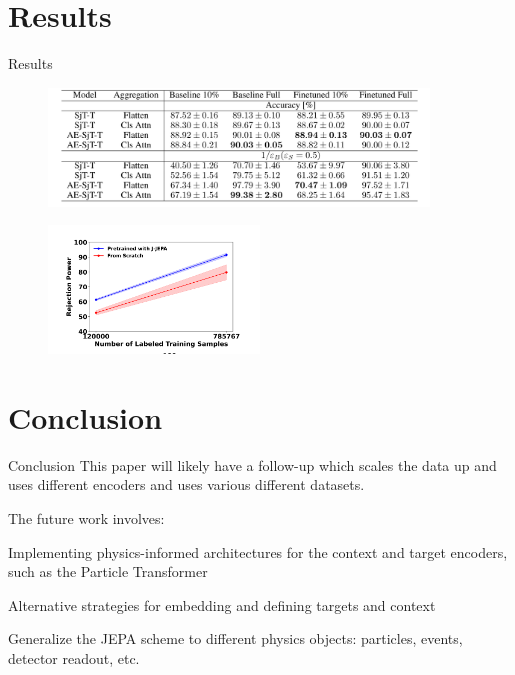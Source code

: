 \documentclass[10pt]{beamer}
\let\olditemize\itemize
\let\endolditemize\enditemize
\renewenvironment{itemize}{
  \olditemize[<+->] %
}{\endolditemize}
\begin{document}
\section{Results}

\begin{frame}{Results}
  \begin{figure}
    \includegraphics[width=0.9\textwidth]{results.png}
  \end{figure}

  \begin{figure}
    \includegraphics[width=0.5\textwidth]{results2.png}
  \end{figure}
\end{frame}

\section{Conclusion}

\begin{frame}{Conclusion}
This paper will likely have a follow-up which scales the data up
and uses different encoders and uses various different datasets.

The future work involves:
\begin{itemize}
  \item Implementing physics-informed architectures for the context
    and target encoders, such as the Particle Transformer
  \item Alternative strategies for embedding
    and defining targets and context
  \item Generalize the JEPA scheme to different physics objects: particles, events,
    detector readout, etc.
\end{itemize}

\end{frame}
\end{document}
